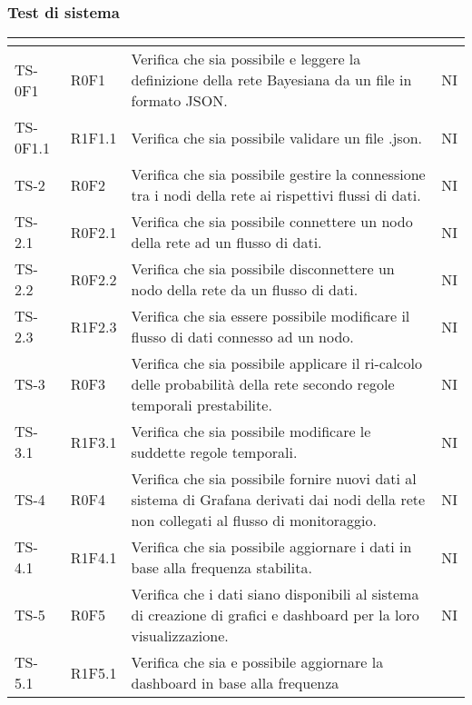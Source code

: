 \subsubsection{Test di sistema}
\begin{longtable}{|C{2.5cm}|C{2.5cm}|C{6.5cm}|C{1.5cm}|}
			\hline
			\textbf{\color{title_text}{Test}} & \textbf{\color{title_text}{Requisito}} & \textbf{\color{title_text}{Descrizione}} & \textbf{\color{title_text}{Stato}} \\
			\hline
			\endhead
			{TS-0F1} & {R0F1} & Verifica che sia possibile e leggere la
			definizione della rete Bayesiana da un
			file in formato JSON.  & {NI}\\
			\hline
			{TS-0F1.1} & {R1F1.1} & Verifica che sia possibile validare un
			file .json. & {NI}\\
			\hline
			{TS-2} & {R0F2} & Verifica che sia possibile gestire la
			connessione tra i nodi della rete ai
			rispettivi flussi di dati. & {NI}\\
			\hline
			{TS-2.1} & {R0F2.1} & Verifica che sia possibile connettere un
			nodo della rete ad un flusso di dati. & {NI}\\
			\hline
			{TS-2.2} & {R0F2.2} & Verifica che sia possibile disconnettere un
			nodo della rete da un flusso di dati. & {NI}\\
			\hline
			{TS-2.3} & {R1F2.3} & Verifica che sia essere possibile modificare il
			flusso di dati connesso ad un nodo. & {NI}\\
			\hline
			{TS-3} & {R0F3} & Verifica che sia possibile applicare il
			ri-calcolo delle probabilità della rete
			secondo regole temporali prestabilite. & {NI}\\
			\hline
			{TS-3.1} & {R1F3.1} & Verifica che sia possibile modificare le
			suddette regole temporali. & {NI}\\
			\hline
			{TS-4} & {R0F4} & Verifica che sia possibile fornire nuovi dati
			al sistema di Grafana derivati dai nodi
			della rete non collegati al flusso di
			monitoraggio. & {NI}\\
			\hline
			{TS-4.1} & {R1F4.1} & Verifica che sia possibile aggiornare i dati
			in base alla frequenza stabilita. & {NI}\\
			\hline
			{TS-5} & {R0F5} & Verifica che i dati siano disponibili al sistema di
			creazione di grafici e dashboard per la
			loro visualizzazione. & {NI}\\
			\hline
			{TS-5.1} & {R1F5.1} & Verifica che sia e possibile aggiornare la
			dashboard in base alla frequenza

\end{longtable}
